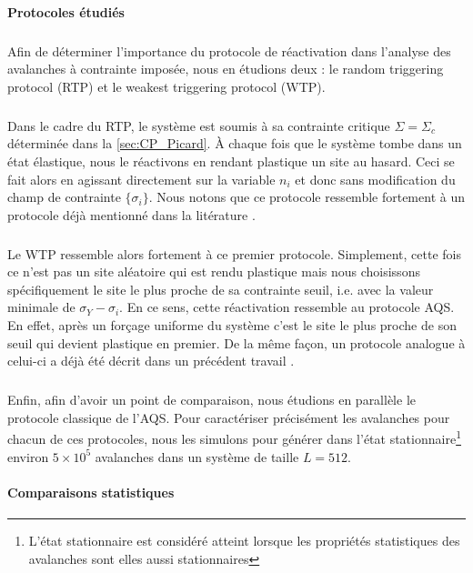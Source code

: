 \paragraph{Protocoles étudiés}

\subparagraph{}Afin de déterminer l'importance du protocole de réactivation dans l'analyse des avalanches à contrainte imposée, nous en étudions deux : le random triggering protocol (RTP) et le weakest triggering protocol (WTP).

\subparagraph{}Dans le cadre du RTP, le système est soumis à sa contrainte critique $\Sigma = \Sigma_c$ déterminée dans la \autoref{sec:CP_Picard}. \`A chaque fois que le système tombe dans un état élastique, nous le réactivons en rendant plastique un site au hasard. Ceci se fait alors en agissant directement sur la variable $n_i$ et donc sans modification du champ de contrainte $\{\sigma_i\}$. Nous notons que ce protocole ressemble fortement à un protocole déjà mentionné dans la litérature \cite{lin_scaling_2014}.

\subparagraph{}Le WTP ressemble alors fortement à ce premier protocole. Simplement, cette fois ce n'est pas un site aléatoire qui est rendu plastique mais nous choisissons spécifiquement le site le plus proche de sa contrainte seuil, i.e. avec la valeur minimale de $\sigma_Y - \sigma_i$. En ce sens, cette réactivation ressemble au protocole AQS. En effet, après un forçage uniforme du système c'est le site le plus proche de son seuil qui devient plastique en premier. De la même façon, un protocole analogue à celui-ci a déjà été décrit dans un précédent travail \cite{lin_scaling_2014}.

\subparagraph{}Enfin, afin d'avoir un point de comparaison, nous étudions en parallèle le protocole classique de l'AQS. Pour caractériser précisément les avalanches pour chacun de ces protocoles, nous les simulons pour générer dans l'état stationnaire\footnote{L'état stationnaire est considéré atteint lorsque les propriétés statistiques des avalanches sont elles aussi stationnaires} environ $5\times 10^5$ avalanches dans un système de taille $L=512$.

\paragraph{Comparaisons statistiques}


